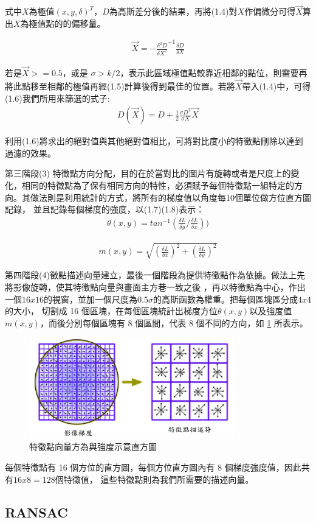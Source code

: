    式中$X$為極值$(x,y,\delta)^T$，$D$為高斯差分後的結果，再將(1.4)對$X$作偏微分可得$\vec{X}$算出$X$為極值點的的偏移量。
   
\begin{align}
  \vec{X} = -\frac{\delta^2 D}{\delta X^2}^{-1}\frac{\delta D}{\delta X}
\end{align}   
   
   
   若是$\vec{X} >= 0.5$，或是 $\sigma > k/2$，表示此區域極值點較靠近相鄰的點位，則需要再將此點移至相鄰的極值再經(1.5)計算後得到最佳的位置。若將$\vec{X}$帶入(1.4)中，可得(1.6)我們所用來篩選的式子:  
\begin{align}
  D(\vec{X}) = D+\frac{1}{2} \frac{\sigma D^T}{\sigma X} \vec{X}
\end{align}      
   
   利用(1.6)將求出的絕對值與其他絕對值相比，可將對比度小的特徵點刪除以達到過濾的效果。
   
   第三階段(3) 特徵點方向分配，目的在於當對比的圖片有旋轉或者是尺度上的變化，相同的特徵點為了保有相同方向的特性，必須賦予每個特徵點一組特定的方向。其做法則是利用統計的方式，將所有的梯度值以角度每10個單位做方位直方圖記錄，
並且記錄每個梯度的強度，以(1.7)(1.8)表示：
\begin{align}
	\theta (x,y)= tan^{-1}(\frac{\delta L}{\delta y}/\frac{\delta L}{\delta x}))
\end{align}      
   
\begin{align}
	m(x,y) = \sqrt{(\frac{\delta L}{\delta x})^2+(\frac{\delta L}{\delta y})^2}
\end{align}


   第四階段(4)徵點描述向量建立，最後一個階段為提供特徵點作為依據。做法上先將影像旋轉，使其特徵點向量與畫面主方巷一致之後
   ，再以特徵點為中心，作出一個$16 x 16$的視窗，並加一個尺度為$0.5\sigma$的高斯函數為權重。把每個區塊區分成$4 x 4$的大小，
   切割成 16 個區塊，在每個區塊統計出梯度方位$ \theta (x,y)$以及強度值$m(x,y)$，而後分別每個區塊有 8 個區間，代表 8 
   個不同的方向，如 \ref{fig:SIFT Histogram} 所表示。

\begin{figure}
\begin{center}
  \includegraphics[width=0.8\textwidth]{figures/SIFT_histogram.jpg}
  \caption{特徵點向量方為與強度示意直方圖}
  \label{fig:SIFT Histogram}
\end{center}
\end{figure}  

     每個特徵點有 16 個方位的直方圖，每個方位直方圖內有 8 個梯度強度值，因此共有$ 16 x 8 = 128$個特徵值，
     這些特徵點則為我們所需要的描述向量。

\subsection{RANSAC}



